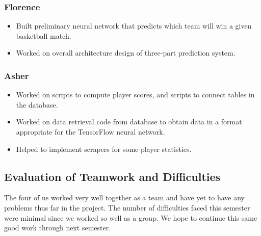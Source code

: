\subsubsection{Florence}
\begin{itemize}
  \item Built preliminary neural network that predicts which team will win a given basketball match.
  \item Worked on overall architecture design of three-part prediction system.
\end{itemize}
\subsubsection{Asher}
\begin{itemize}
  \item Worked on scripts to compute player scores, and scripts to connect tables in the database.
  \item Worked on data retrieval code from database to obtain data in a format appropriate for the TensorFlow neural network.
  \item Helped to implement scrapers for some player statistics.
\end{itemize}

\subsection{Evaluation of Teamwork and Difficulties}
The four of us worked very well together as a team and have yet to have any problems thus far in the project. The number of difficulties faced this semester were minimal since we worked so well as a group. We hope to continue this same good work through next semester.
